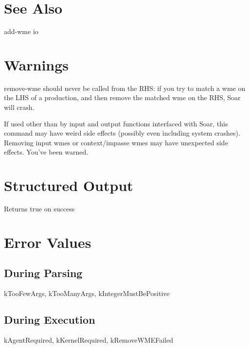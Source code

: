 \documentclass[10pt]{article}
\begin{document}
\section*{ See Also }


 add-wme io
\section*{ Warnings }


 remove-wme should never be called from the RHS: if you try to match a wme on the LHS of a production, and then remove the matched wme on the RHS, Soar will crash. 


 If used other than by input and output functions interfaced with Soar, this command may have weird side effects (possibly even including system crashes). Removing input wmes or context/impasse wmes may have unexpected side effects. You've been warned. 
\section*{ Structured Output }


 Returns true on success 
\section*{ Error Values }
\subsection*{ During Parsing }


 kTooFewArgs, kTooManyArgs, kIntegerMustBePositive
\subsection*{ During Execution }


 kAgentRequired, kKernelRequired, kRemoveWMEFailed
\end{document}
